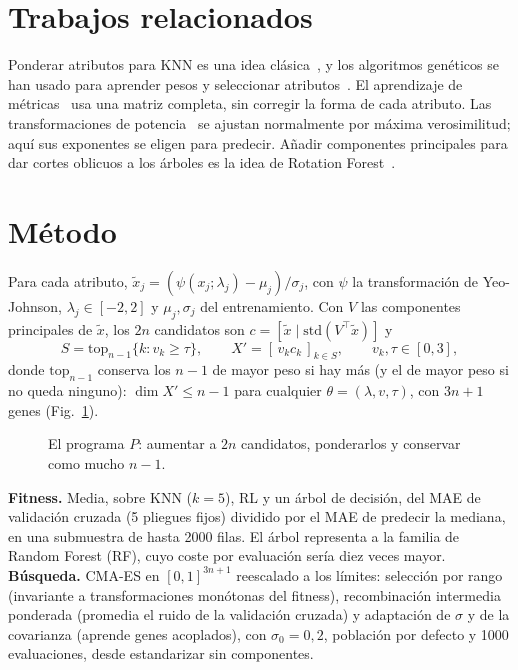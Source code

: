 \documentclass[runningheads]{llncs}
\begin{document}
\section{Trabajos relacionados}
Ponderar atributos para KNN es una idea clásica~\cite{wettschereck1997}, y los algoritmos genéticos se han usado para
aprender pesos y seleccionar atributos~\cite{raymer2000}. El aprendizaje de métricas~\cite{weinberger2009} usa una
matriz completa, sin corregir la forma de cada atributo. Las transformaciones de potencia~\cite{yeo2000} se ajustan
normalmente por máxima verosimilitud; aquí sus exponentes se eligen para predecir. Añadir componentes principales para
dar cortes oblicuos a los árboles es la idea de Rotation Forest~\cite{rodriguez2006}.

\section{Método}
Para cada atributo, $\tilde x_j=(\psi(x_j;\lambda_j)-\mu_j)/\sigma_j$, con $\psi$ la transformación de Yeo-Johnson,
$\lambda_j\in[-2,2]$ y $\mu_j,\sigma_j$ del entrenamiento. Con $V$ las componentes principales de $\tilde x$, los $2n$
candidatos son $c=[\tilde x\mid \mathrm{std}(V^\top\tilde x)]$ y
\begin{equation}
S=\mathrm{top}_{n-1}\{k: v_k\ge\tau\},\qquad X'=[\,v_k c_k\,]_{k\in S},\qquad v_k,\tau\in[0,3],
\end{equation}
donde $\mathrm{top}_{n-1}$ conserva los $n-1$ de mayor peso si hay más (y el de mayor peso si no queda ninguno): $\dim
X'\le n-1$ para cualquier $\theta=(\lambda,v,\tau)$, con $3n+1$ genes (Fig.~\ref{fig:esquema}).

\begin{figure}[t]\centering{}

\caption{El programa $P$: aumentar a $2n$ candidatos, ponderarlos y conservar como mucho $n-1$.}
\label{fig:esquema}
\end{figure}

\textbf{Fitness.} Media, sobre KNN ($k=5$), RL y un árbol de decisión, del MAE de validación cruzada (5 pliegues
fijos) dividido por el MAE de predecir la mediana, en una submuestra de hasta 2000 filas. El árbol representa a la
familia de Random Forest (RF), cuyo coste por evaluación sería diez veces mayor.
\textbf{Búsqueda.} CMA-ES en $[0,1]^{3n+1}$ reescalado a los límites: selección por rango (invariante a
transformaciones monótonas del fitness), recombinación intermedia ponderada (promedia el ruido de la validación
cruzada) y adaptación de $\sigma$ y de la covarianza (aprende genes acoplados), con $\sigma_0=0{,}2$, población por
defecto y 1000 evaluaciones, desde estandarizar sin componentes.
\end{document}
